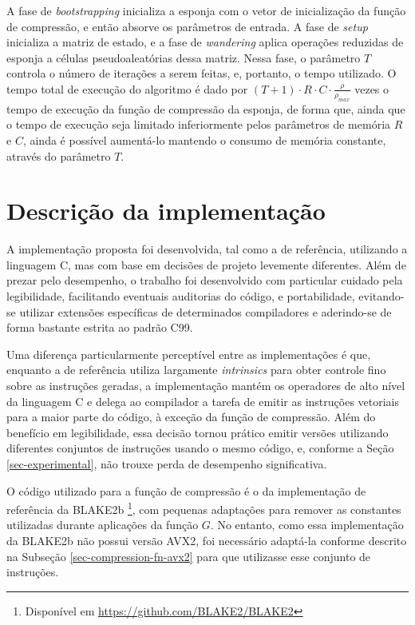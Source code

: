 \documentclass{article}
\begin{document}
A fase de \emph{bootstrapping} inicializa a esponja com o vetor de
inicialização da função de compressão, e então absorve os parâmetros de
entrada. A fase de \emph{setup} inicializa a matriz de estado, e a fase
de \emph{wandering} aplica operações reduzidas de esponja a células
pseudoaleatórias dessa matriz. Nessa fase, o parâmetro $T$ controla o
número de iterações a serem feitas, e, portanto, o tempo utilizado.
O tempo total de execução do algoritmo é dado por
$(T + 1) \cdot R \cdot C \cdot \frac{\rho}{\rho_{max}}$ vezes o tempo
de execução da função de compressão da esponja, de forma que, ainda que
o tempo de execução seja limitado inferiormente pelos parâmetros de
memória $R$ e $C$, ainda é possível aumentá-lo mantendo o consumo de
memória constante, através do parâmetro $T$.

\section{Descrição da implementação}

A implementação proposta foi desenvolvida, tal como a de referência, utilizando
a linguagem C, mas com base em decisões de projeto levemente diferentes. Além
de prezar pelo desempenho, o trabalho foi desenvolvido com particular cuidado
pela legibilidade, facilitando eventuais auditorias do código, e portabilidade,
evitando-se utilizar extensões específicas de determinados compiladores e
aderindo-se de forma bastante estrita ao padrão C99.

Uma diferença particularmente perceptível entre as implementações é que,
enquanto a de referência utiliza largamente \emph{intrinsics} para obter
controle fino sobre as instruções geradas, a implementação mantém os
operadores de alto nível da linguagem C e delega ao compilador a tarefa
de emitir as instruções vetoriais para a maior parte do código, à
exceção da função de compressão. Além do benefício em legibilidade, essa
decisão tornou prático emitir versões utilizando diferentes conjuntos de
instruções usando o mesmo código, e, conforme a Seção
\ref{sec-experimental}, não trouxe perda de desempenho significativa.

O código utilizado para a função de compressão é o da implementação de
referência da BLAKE2b \footnote{Disponível em
  \url{https://github.com/BLAKE2/BLAKE2}}, com pequenas adaptações para
remover as constantes utilizadas durante aplicações da função $G$. No
entanto, como essa implementação da BLAKE2b não possui versão AVX2, foi
necessário adaptá-la conforme descrito na Subseção \ref{sec-compression-fn-avx2}
para que utilizasse esse conjunto de instruções.
\end{document}
